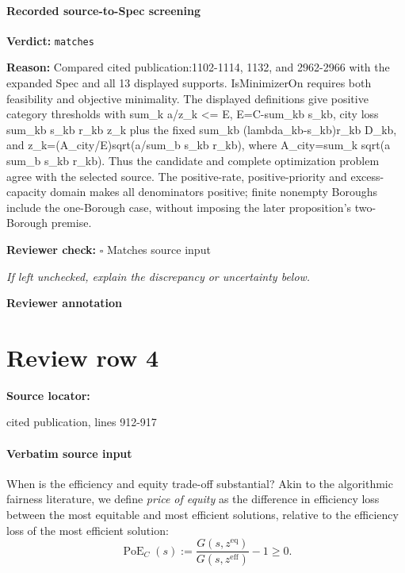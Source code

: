 \documentclass[10pt]{article}
\newcommand{\reviewerbox}{%
  \par\noindent\fbox{\parbox{0.96\linewidth}{\rule{0pt}{0.38in}}}\par
}
\newcommand{\reviewmatch}[1]{%
  \par\noindent\textbf{Reviewer check:} $\square$\; #1\par
  \noindent\emph{If left unchecked, explain the discrepancy or uncertainty below.}\par
}
\begin{document}
\paragraph{Recorded source-to-Spec screening}
\textbf{Verdict:} \texttt{matches}
\\
{\raggedright
\textbf{Reason:} Compared cited publication:\allowbreak{}1102-\allowbreak{}1114, 1132, and 2962-\allowbreak{}2966 with the expanded Spec and all 13 displayed supports.\allowbreak{} IsMinimizerOn requires both feasibility and objective minimality.\allowbreak{} The displayed definitions give positive category thresholds with sum\_\allowbreak{}k a/\allowbreak{}z\_\allowbreak{}k <= E, E=C-\allowbreak{}sum\_\allowbreak{}kb s\_\allowbreak{}kb, city loss sum\_\allowbreak{}kb s\_\allowbreak{}kb r\_\allowbreak{}kb z\_\allowbreak{}k plus the fixed sum\_\allowbreak{}kb (lambda\_\allowbreak{}kb-\allowbreak{}s\_\allowbreak{}kb)r\_\allowbreak{}kb D\_\allowbreak{}kb, and z\_\allowbreak{}k=(A\_\allowbreak{}city/\allowbreak{}E)sqrt(a/\allowbreak{}sum\_\allowbreak{}b s\_\allowbreak{}kb r\_\allowbreak{}kb), where A\_\allowbreak{}city=sum\_\allowbreak{}k sqrt(a sum\_\allowbreak{}b s\_\allowbreak{}kb r\_\allowbreak{}kb).\allowbreak{} Thus the candidate and complete optimization problem agree with the selected source.\allowbreak{} The positive-\allowbreak{}rate, positive-\allowbreak{}priority and excess-\allowbreak{}capacity domain makes all denominators positive;\allowbreak{} finite nonempty Boroughs include the one-\allowbreak{}Borough case, without imposing the later proposition's two-\allowbreak{}Borough premise.\allowbreak{}
\par}
\reviewmatch{Matches source input}
\noindent\textbf{Reviewer annotation}\par
\reviewerbox
\clearpage
\hypertarget{source-claim-c4fbeaf356a51e36}{}
\section*{Review row 4}
\textbf{Source locator:} {\footnotesize\raggedright cited publication, lines 912-\allowbreak{}917\par}
\paragraph{Verbatim source input}
\begin{ReviewVerbatim}
When is the efficiency and equity trade-off substantial? Akin to the algorithmic fairness literature, we define \textit{price of equity} as the difference in efficiency loss between {the most equitable and most efficient solutions}, relative to the efficiency loss of the most efficient solution:
\begin{equation}
{\operatorname{PoE}_C(s)
:=\frac{G(s,z^{\mathrm{eq}})}{G(s,z^{\mathrm{eff}})}-1 \geq 0.}
\label{eq:price-of-equity-definition}
\end{equation}
\end{ReviewVerbatim}
\end{document}
